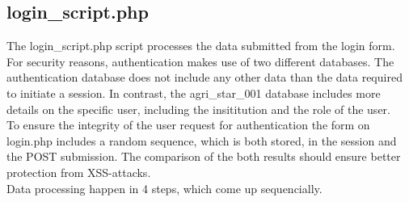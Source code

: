 \subsection{login\_script.php}
The login\_script.php script processes the data submitted from the login form. For security reasons, 
authentication makes use of two different databases. The authentication database does not include any other data than the data required to initiate a session. In contrast,
the agri\_star\_001 database includes more details on the specific user, including the insititution and the role of the user.\\
To ensure the integrity of the user request for authentication the form on login.php includes a random sequence, which is both stored, in the session and the POST submission. 
The comparison of the both results should ensure better protection from XSS-attacks.\\
Data processing happen in 4 steps, which come up sequencially.
